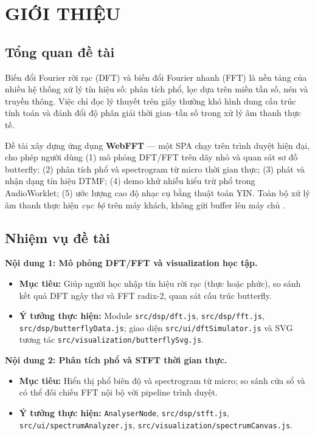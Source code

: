 \pagestyle{fancy}
\chapter{GIỚI THIỆU}

\section{Tổng quan đề tài}
Biến đổi Fourier rời rạc (DFT) và biến đổi Fourier nhanh (FFT) là nền tảng của nhiều hệ thống xử lý tín hiệu số: phân tích phổ, lọc dựa trên miền tần số, nén và truyền thông. Việc chỉ đọc lý thuyết trên giấy thường khó hình dung cấu trúc tính toán và đánh đổi độ phân giải thời gian--tần số trong xử lý âm thanh thực tế.

Đề tài xây dựng ứng dụng \textbf{WebFFT} --- một SPA chạy trên trình duyệt hiện đại, cho phép người dùng (1) mô phỏng DFT/FFT trên dãy nhỏ và quan sát sơ đồ butterfly; (2) phân tích phổ và spectrogram từ micro thời gian thực; (3) phát và nhận dạng tín hiệu DTMF; (4) demo khử nhiễu kiểu trừ phổ trong AudioWorklet; (5) ước lượng cao độ nhạc cụ bằng thuật toán YIN. Toàn bộ xử lý âm thanh thực hiện \textit{cục bộ} trên máy khách, không gửi buffer lên máy chủ \cite{repoWebFFT}.

\section{Nhiệm vụ đề tài}

\noindent\textbf{Nội dung 1: Mô phỏng DFT/FFT và visualization học tập.}\\
\vspace{-0.6cm}
\begin{itemize}\itemsep0pt \parskip0pt 
	\item \textbf{Mục tiêu:} Giúp người học nhập tín hiệu rời rạc (thực hoặc phức), so sánh kết quả DFT ngây thơ và FFT radix-2, quan sát cấu trúc butterfly.
	\item \textbf{Ý tưởng thực hiện:} Module \verb|src/dsp/dft.js|, \verb|src/dsp/fft.js|, \verb|src/dsp/butterflyData.js|; giao diện \verb|src/ui/dftSimulator.js| và SVG tương tác \verb|src/visualization/butterflySvg.js|.
\end{itemize}
\vspace{-0.2cm}

\noindent\textbf{Nội dung 2: Phân tích phổ và STFT thời gian thực.}\\
\vspace{-0.6cm}
\begin{itemize}\itemsep0pt \parskip0pt 
	\item \textbf{Mục tiêu:} Hiển thị phổ biên độ và spectrogram từ micro; so sánh cửa sổ và có thể đối chiếu FFT nội bộ với pipeline trình duyệt.
	\item \textbf{Ý tưởng thực hiện:} \verb|AnalyserNode|, \verb|src/dsp/stft.js|, \verb|src/ui/spectrumAnalyzer.js|, \verb|src/visualization/spectrumCanvas.js|.
\end{itemize}
\vspace{-0.2cm}


